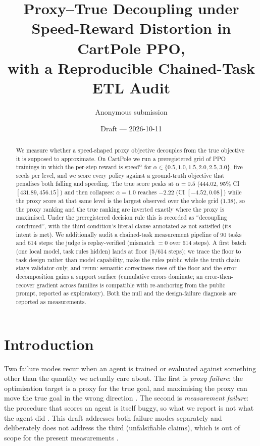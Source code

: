 \documentclass[11pt]{article}
\title{Proxy--True Decoupling under Speed-Reward Distortion in CartPole PPO,\\
with a Reproducible Chained-Task ETL Audit}
\author{Anonymous submission}
\date{Draft --- 2026-10-11}
\begin{document}
\maketitle

\begin{abstract}
We measure whether a speed-shaped proxy objective decouples from the true
objective it is supposed to approximate. On CartPole we run a preregistered
grid of PPO trainings in which the per-step reward is $\mathrm{speed}^{\alpha}$
for $\alpha \in \{0.5, 1.0, 1.5, 2.0, 2.5, 3.0\}$, five seeds per level, and we
score every policy against a ground-truth objective that penalises both
falling and speeding. The true score peaks at $\alpha=0.5$
($444.02$, 95\% CI $[431.89, 456.15]$) and then collapses: $\alpha=1.0$
reaches $-2.22$ (CI $[-4.52, 0.08]$) while the proxy score at that same level
is the largest observed over the whole grid ($1.38$), so the proxy ranking and
the true ranking are inverted exactly where the proxy is maximised. Under the
preregistered decision rule this is recorded as ``decoupling confirmed'',
with the third condition's literal clause annotated as not satisfied
(its intent is met). We additionally audit a chained-task
measurement pipeline of 90 tasks and 614 steps: the judge is replay-verified
(mismatch $=0$ over 614 steps). A first batch (one local model, task rules
hidden) lands at floor (5/614 steps); we trace the floor to task design
rather than model capability, make the rules public while the truth chain
stays validator-only, and rerun: semantic correctness rises off the floor
and the error decomposition gains a support surface (cumulative errors
dominate; an error-then-recover gradient across families is compatible with
re-anchoring from the public prompt, reported as exploratory). Both the
null and the design-failure diagnosis are reported as measurements.
\end{abstract}

\section{Introduction}
\label{sec:intro}

Two failure modes recur when an agent is trained or evaluated against
something other than the quantity we actually care about. The first is
\emph{proxy failure}: the optimisation target is a proxy for the true goal,
and maximising the proxy can move the true goal in the wrong direction
\cite{goodhart1975problems,campbell1979assessing}. The second is
\emph{measurement failure}: the procedure that scores an agent is itself
buggy, so what we report is not what the agent did
\cite{strathern1997improving,sainz2024nlp}. This draft addresses both
failure modes separately and deliberately does not address the third
(unfalsifiable claims), which is out of scope for the present measurements
\cite{popper1963conjectures}.
\end{document}
